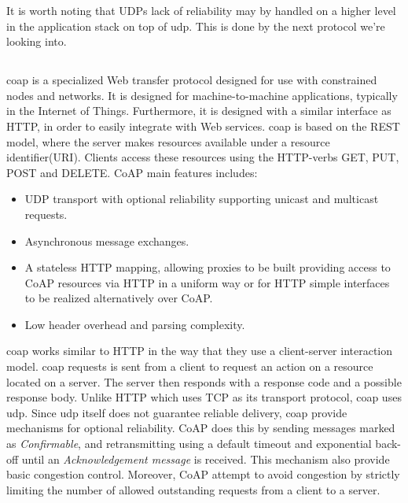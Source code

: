  It is worth noting that UDPs lack of reliability may by handled on a higher
 level in the application stack on top of \gls{udp}. This is done by the next
 protocol we're looking into.

\subsection{}

\gls{coap} is a specialized Web transfer protocol designed for use with
constrained nodes and  networks\cite{rfc-7252}. It is designed for
machine-to-machine applications, typically in the Internet of Things.
Furthermore, it is designed with a similar interface as HTTP, in order to easily
integrate with Web services. \gls{coap} is based on the REST model, where the
server makes resources available  under a resource identifier(URI). Clients
access these resources using the HTTP-verbs GET, PUT, POST and DELETE. CoAP main
features includes:

\begin{itemize}

    \item UDP transport with optional reliability supporting unicast and
    multicast requests.

    \item Asynchronous message exchanges.

    \item A stateless HTTP mapping, allowing proxies to be built providing
    access to CoAP resources via HTTP in a uniform way or for HTTP simple
    interfaces to be realized alternatively over CoAP.

     \item Low header overhead and parsing complexity.

\end{itemize}

\gls{coap} works similar to HTTP in the way that they use a client-server
interaction model. \gls{coap} requests is sent from a client to request an
action on a resource located on a server. The server then responds with a
response code and a possible response body. Unlike HTTP which uses TCP as its
transport protocol, \gls{coap} uses \gls{udp}. Since \gls{udp} itself does not
guarantee reliable delivery, \gls{coap} provide mechanisms for optional
reliability. CoAP does this by sending messages marked as \textit{Confirmable},
and retransmitting using a default timeout and exponential back-off until an
\textit{Acknowledgement message} is received. This mechanism also provide basic
congestion control. Moreover, CoAP attempt to avoid congestion by strictly
limiting the number of allowed outstanding requests from a client to a server.

